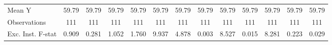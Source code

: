 {\begin{tabular}{l*{12}{c}}
\midrule
Mean Y      &       59.79         &       59.79         &       59.79         &       59.79         &       59.79         &       59.79         &       59.79         &       59.79         &       59.79         &       59.79         &       59.79         &       59.79         \\
Observations&         111         &         111         &         111         &         111         &         111         &         111         &         111         &         111         &         111         &         111         &         111         &         111         \\
Exc. Inst. F-stat&       0.909         &       0.281         &       1.052         &       1.760         &       9.937         &       4.878         &       0.003         &       8.527         &       0.015         &       8.281         &       0.223         &       0.029         \\
\bottomrule
\end{tabular}
}
